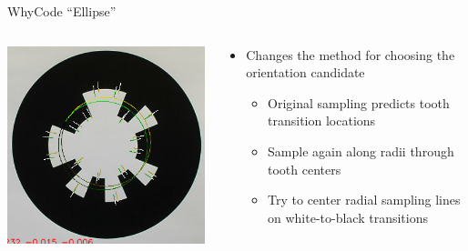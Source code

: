 \documentclass[aspectratio=169]{beamer}
\begin{document}
\begin{frame}{WhyCode ``Ellipse''}
	\begin{columns}
	\begin{column}{0.4\textwidth}
		\centering
		\includegraphics[width=\linewidth]{./images/whycode_ellipse_both_solutions_cropped.png}
	\end{column}
	\begin{column}{0.6\textwidth}
	\begin{itemize}
		\item Changes the method for choosing the orientation candidate
		\begin{itemize}
			\item Original sampling predicts tooth transition locations
			\item Sample again along radii through tooth centers
			\item Try to center radial sampling lines on white-to-black transitions
		\end{itemize}
	\end{itemize}
	\end{column}
	\end{columns}
\end{frame}
\end{document}
